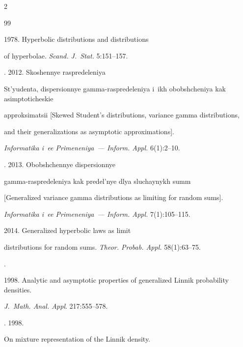 \begin{multicols}{2}
{{\begin{thebibliography}{99}


 1978. Hyperbolic distributions and distributions 


of hyperbolae. \textit{Scand. J.~Stat.} 5:151--157. 




. 2012. Skoshennye raspredeleniya 


St'yudenta, dispersionnye gamma-raspredeleniya i~ikh obobshcheniya kak asimptoticheskie 


approksimatsii [Skewed Student's distributions, variance gamma distributions, 


and their generalizations as asymptotic approximations]. 


\textit{Informatika i~ee Primeneniya~--- Inform. Appl.} 6(1):2--10. 




. 2013. Obobshchennye dispersionnye 


gamma-raspredeleniya kak predel'nye dlya sluchaynykh summ 


[Generalized variance gamma distributions as limiting for random sums]. 


\textit{Informatika i~ee Primeneniya~--- Inform. Appl.} 7(1):105--115. 







 2014. Generalized hyperbolic laws as limit


distributions for random sums. \textit{Theor. Probab. Appl.} 58(1):63--75.












. 


1998. Analytic and asymptotic properties of generalized Linnik probability densities. 


\textit{J.~Math. Anal. Appl}. 217:555--578.  




. 1998. 


On mixture representation of the Linnik density.



\end{thebibliography}}}
\end{multicols}
